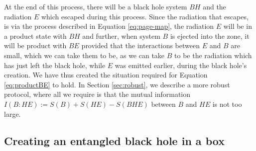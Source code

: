 \documentclass[11pt,a4paper]{article}
\begin{document}
At the end of this process, there will be a black hole system $BH$ and the radiation $E$ which escaped during this process. Since the radiation that escapes, is via the process described in Equation \eqref{eq:page-map}, the radiation $E$ will be in a product state with $BH$ and further, when system $B$ is ejected into the zone, it will be product with $BE$ provided that the interactions between $E$ and $B$ are small, which we can take them to be, as we can take $B$ to be the radiation which has just left the black hole, while $E$ was emitted earlier, during the black hole's creation. We have thus created the situation required for Equation \eqref{eq:productBE} to hold. In Section \ref{sec:robust}, we describe a more robust protocol, where all we require is that the mutual information $I(B:HE):=S(B)+S(HE)-S(BHE)$ between $B$ and $HE$ is not too large.

\subsection{Creating an entangled black hole in a box}
\label{ss:creatingbox}
\end{document}
